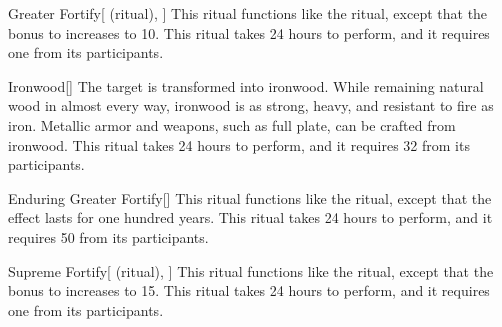 \lowercase{\hypertarget{spell:Greater Fortify}{}}\label{spell:Greater Fortify}
\begin{attuneability}[Rank 4]{\hypertarget{spell:Greater Fortify}{Greater Fortify}}[ (ritual), ]
This ritual functions like the  ritual, except that the bonus to  increases to 10.
This ritual takes 24 hours to perform, and it requires one  from its participants.
\end{attuneability}
\vspace{0.25em}



\lowercase{\hypertarget{spell:Ironwood}{}}\label{spell:Ironwood}
\begin{freeability}[Rank 4]{\hypertarget{spell:Ironwood}{Ironwood}}[]
The target is transformed into ironwood.
While remaining natural wood in almost every way, ironwood is as strong, heavy, and resistant to fire as iron.
Metallic armor and weapons, such as full plate, can be crafted from ironwood.
This ritual takes 24 hours to perform, and it requires 32  from its participants.
\end{freeability}
\vspace{0.25em}



\lowercase{\hypertarget{spell:Enduring Greater Fortify}{}}\label{spell:Enduring Greater Fortify}
\begin{freeability}[Rank 5]{\hypertarget{spell:Enduring Greater Fortify}{Enduring Greater Fortify}}[]
This ritual functions like the  ritual, except that the effect lasts for one hundred years.
This ritual takes 24 hours to perform, and it requires 50  from its participants.
\end{freeability}
\vspace{0.25em}



\lowercase{\hypertarget{spell:Supreme Fortify}{}}\label{spell:Supreme Fortify}
\begin{attuneability}[Rank 7]{\hypertarget{spell:Supreme Fortify}{Supreme Fortify}}[ (ritual), ]
This ritual functions like the  ritual, except that the bonus to  increases to 15.
This ritual takes 24 hours to perform, and it requires one  from its participants.
\end{attuneability}
\vspace{0.25em}


